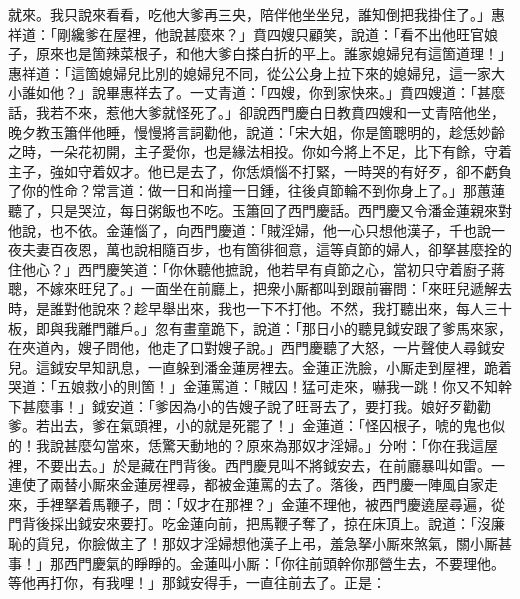 就來。我只說來看看，吃他大爹再三央，陪伴他坐坐兒，誰知倒把我掛住了。」惠祥道：「剛纔爹在屋裡，他說甚麼來？」賁四嫂只顧笑，說道：「看不出他旺官娘子，原來也是箇辣菜根子，{}和他大爹白搽白折的平上。誰家媳婦兒有這箇道理！」惠祥道：「這箇媳婦兒比別的媳婦兒不同，從公公身上拉下來的媳婦兒，{}這一家大小誰如他？」說畢惠祥去了。一丈青道：「四嫂，你到家快來。」賁四嫂道：「甚麼話，我若不來，惹他大爹就怪死了。」卻說西門慶白日教賁四嫂和一丈青陪他坐，晚夕教玉簫伴他睡，慢慢將言詞勸他，說道：「宋大姐，你是箇聰明的，趁恁妙齡之時，一朵花初開，主子愛你，也是緣法相投。你如今將上不足，比下有餘，守着主子，強如守着奴才。他已是去了，你恁煩惱不打緊，一時哭的有好歹，卻不虧負了你的性命？常言道：做一日和尚撞一日鍾，往後貞節輪不到你身上了。」{}那蕙蓮聽了，只是哭泣，每日粥飯也不吃。{}玉簫回了西門慶話。西門慶又令潘金蓮親來對他說，也不依。金蓮惱了，向西門慶道：「賊淫婦，他一心只想他漢子，千也說一夜夫妻百夜恩，萬也說相隨百步，也有箇徘徊意，這等貞節的婦人，卻拏甚麼拴的住他心？」西門慶笑道：「你休聽他摭說，他若早有貞節之心，當初只守着廚子蔣聰，不嫁來旺兒了。」{}一面坐在前廳上，把衆小厮都叫到跟前審問：「來旺兒遞解去時，是誰對他說來？趁早舉出來，我也一下不打他。不然，我打聽出來，每人三十板，即與我離門離戶。」忽有畫童跪下，說道：「那日小的聽見鉞安跟了爹馬來家，在夾道內，嫂子問他，他走了口對嫂子說。」西門慶聽了大怒，一片聲使人尋鉞安兒。這鉞安早知訊息，一直躲到潘金蓮房裡去。金蓮正洗臉，小厮走到屋裡，跪着哭道：「五娘救小的則箇！」金蓮罵道：「賊囚！猛可走來，嚇我一跳！你又不知幹下甚麼事！」鉞安道：「爹因為小的告嫂子說了旺哥去了，要打我。娘好歹勸勸爹。若出去，爹在氣頭裡，小的就是死罷了！」金蓮道：「怪囚根子，唬的鬼也似的！我說甚麼勾當來，恁驚天動地的？原來為那奴才淫婦。」分咐：「你在我這屋裡，不要出去。」於是藏在門背後。西門慶見叫不將鉞安去，在前廳暴叫如雷。一連使了兩替小厮來金蓮房裡尋，都被金蓮罵的去了。落後，西門慶一陣風自家走來，手裡拏着馬鞭子，問：「奴才在那裡？」金蓮不理他，被西門慶遶屋尋遍，從門背後採出鉞安來要打。吃金蓮向前，把馬鞭子奪了，掠在床頂上。{}說道：「沒廉恥的貨兒，你臉做主了！那奴才淫婦想他漢子上弔，羞急拏小厮來煞氣，關小厮甚事！」那西門慶氣的睜睜的。{}金蓮叫小厮：「你往前頭幹你那營生去，不要理他。等他再打你，有我哩！」那鉞安得手，一直往前去了。正是：

